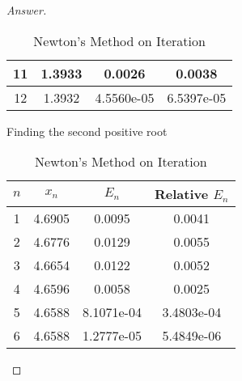 \begin{proof}[Answer]
\begin{table}[htbp]
\begin{subtable}[t]{.48\linewidth}
\begin{tabular}[t]{|c|c|c|c|}
		11	&	1.3933	&	0.0026	&	0.0038	\\	\hline
		12	&	1.3932	&	4.5560e-05	&	6.5397e-05	\\	\hline
		\end{tabular}
	\end{subtable}
	\hfill
	\begin{subtable}[t]{.48\linewidth}
		\centering
		\caption{Finding the second positive root}
		\begin{tabular}[t]{|c|c|c|c|}
		\hline
		$n$ & \(x_n\) & \(E_n\) & Relative \(E_n\) \\	\hline
		1	&	4.6905	&	0.0095	&	0.0041	\\	\hline
		2	&	4.6776	&	0.0129	&	0.0055	\\	\hline
		3	&	4.6654	&	0.0122	&	0.0052	\\	\hline
		4	&	4.6596	&	0.0058	&	0.0025	\\	\hline
		5	&	4.6588	&	8.1071e-04	&	3.4803e-04	\\	\hline
		6	&	4.6588	&	1.2777e-05	&	5.4849e-06	\\	\hline
		\end{tabular}
	\end{subtable}
	\caption{Newton's Method on Iteration}
	\label{newtoniteration}
\end{table}

\end{proof}



